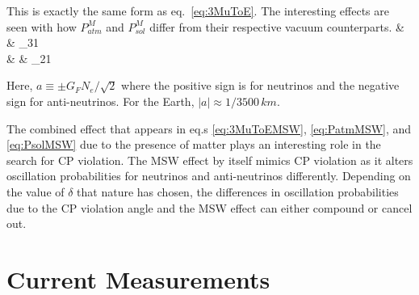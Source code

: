 \n This is exactly the same form as eq.~\ref{eq:3MuToE}. The interesting effects are seen with how $P^M_{atm}$ and $P^M_{sol}$ differ from their respective vacuum counterparts.
\beqa
{} & \equiv & \sin {}   \Delta_{31} \label{eq:PatmMSW} \\
 & \equiv & \cos {}   \Delta_{21} \label{eq:PsolMSW}
\eeqa

\n Here, $a \equiv \pm G_F N_e / \sqrt{2}$ where the positive sign is for neutrinos and the negative sign for anti-neutrinos. For the Earth, $\vert a \vert \approx 1/3500\, km$.

The combined effect that appears in eq.s \ref{eq:3MuToEMSW}, \ref{eq:PatmMSW}, and \ref{eq:PsolMSW} due to the presence of matter plays an interesting role in the search for CP violation. The MSW effect by itself mimics CP violation as it alters oscillation probabilities for neutrinos and anti-neutrinos differently. Depending on the value of $\delta$ that nature has chosen, the differences in oscillation probabilities due to the CP violation angle and the MSW effect can either compound or cancel out.

\section{Current Measurements}
\label{sec:BestMeasures}


